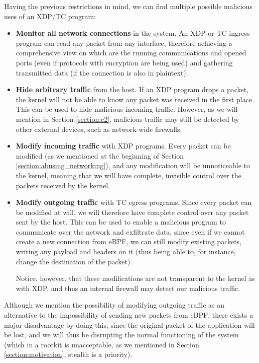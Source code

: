 Having the previous restrictions in mind, we can find multiple possible malicious uses of an XDP/TC program:
\begin{itemize}
\item \textbf{Monitor all network connections} in the system. An XDP or TC ingress program can read any packet from any interface, therefore achieving a comprehensive view on which are the running communications and opened ports (even if protocols with encryption are being used) and gathering transmitted data (if the connection is also in plaintext).
\item \textbf{Hide arbitrary traffic} from the host. If an XDP program drops a packet, the kernel will not be able to know any packet was received in the first place. This can be used to hide malicious incoming traffic. However, as we will mention in Section \ref{section:c2}, malicious traffic may still be detected by other external devices, such as network-wide firewalls.
\item \textbf{Modify incoming traffic} with XDP programs. Every packet can be modified (as we mentioned at the beginning of Section \ref{section:abusing_networking}), and any modification will be unnoticeable to the kernel, meaning that we will have complete, invisible control over the packets received by the kernel.
\item \textbf{Modify outgoing traffic} with TC egress programs. Since every packet can be modified at will, we will therefore have complete control over any packet sent by the host. This can be used to enable a malicious program to communicate over the network and exfiltrate data, since even if we cannot create a new connection from eBPF, we can still modify existing packets, writing any payload and headers on it (thus being able to, for instance, change the destination of the packet).

Notice, however, that these modifications are not transparent to the kernel as with XDP, and thus an internal firewall may detect our malicious traffic.
\end{itemize}

Although we mention the possibility of modifying outgoing traffic as an alternative to the impossibility of sending new packets from eBPF, there exists a major disadvantage by doing this, since the original packet of the application will be lost, and we will thus be disrupting the normal functioning of the system (which in a rootkit is unacceptable, as we mentioned in Section \ref{section:motivation}, stealth is a priority).

